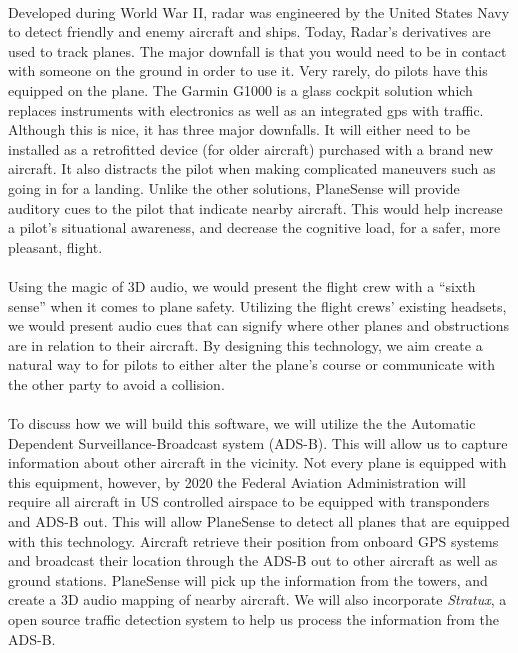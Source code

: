 \paragraph{}
Developed during World War II, radar was engineered by the United States Navy to detect friendly and enemy aircraft and ships. Today, Radar’s derivatives are used to track planes. The major downfall is that you would need to be in contact with someone on the ground in order to use it. Very rarely, do pilots have this equipped on the plane. The Garmin G1000 is a  glass cockpit solution which replaces instruments with electronics as well as an integrated gps with traffic. Although this is nice, it has three major downfalls. It will either need to be installed as a retrofitted device (for older aircraft) purchased with a brand new aircraft. It also distracts the pilot when making complicated maneuvers such as going in for a landing. Unlike the other solutions, PlaneSense will provide auditory cues to the pilot that indicate nearby aircraft. This would help increase a pilot’s situational awareness, and decrease the cognitive load, for a safer, more pleasant, flight. 

\paragraph{}

Using the magic of 3D audio, we would present the flight crew with a “sixth sense” when it comes to plane safety. Utilizing the flight crews’ existing headsets, we would present audio cues that can signify where other planes and obstructions are in relation to their aircraft. By designing this technology, we aim create a natural way to for pilots to either alter the plane’s course or communicate with the other party to avoid a collision. 


\paragraph{}
To discuss how we will build this software, we will utilize the the Automatic Dependent Surveillance-Broadcast system (ADS-B). This will allow us to capture information about other aircraft in the vicinity. Not every plane is equipped with this equipment, however, by 2020 the Federal Aviation Administration will require all aircraft in US controlled airspace to be equipped with transponders and ADS-B out. This will allow PlaneSense to detect all planes that are equipped with this technology. Aircraft retrieve their position from onboard GPS systems and broadcast their location through the ADS-B out to other aircraft as well as ground stations. PlaneSense will pick up the information from the towers, and create a 3D audio mapping of nearby aircraft. We will also incorporate \textit{Stratux}, a open source traffic detection system to help us process the information from the ADS-B.


